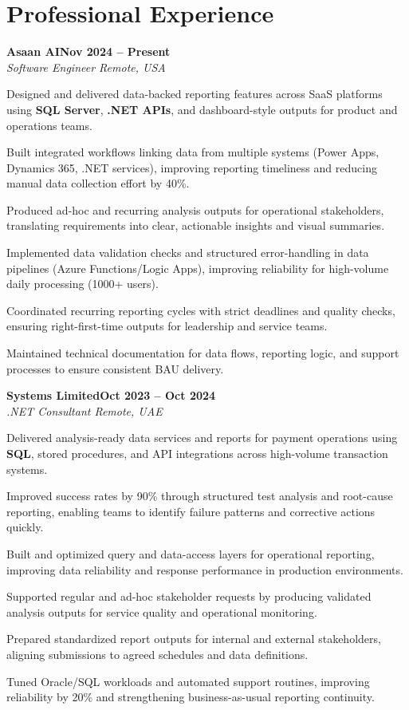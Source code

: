 \documentclass[letterpaper,10pt]{article}
\newcommand{\headingBf}[2]{
  \hspace{10pt}\textbf{#1}\hfill\textbf{#2}\\
}
\newcommand{\headingIt}[2]{
  \hspace{10pt}\textit{#1}\hfill\textit{#2}\\
}
\newenvironment{resume_list}{
  \vspace{-7pt}
  \begin{itemize}[itemsep=-2px, parsep=1pt, leftmargin=30pt]
}{
  \end{itemize}
}
\begin{document}
\section{Professional Experience}

\headingBf{Asaan AI}{Nov 2024 -- Present}
\headingIt{Software Engineer \hfill Remote, USA}{}
\begin{resume_list}
    \item Designed and delivered data-backed reporting features across SaaS platforms using \textbf{SQL Server}, \textbf{.NET APIs}, and dashboard-style outputs for product and operations teams.
    \item Built integrated workflows linking data from multiple systems (Power Apps, Dynamics 365, .NET services), improving reporting timeliness and reducing manual data collection effort by 40\%.
    \item Produced ad-hoc and recurring analysis outputs for operational stakeholders, translating requirements into clear, actionable insights and visual summaries.
    \item Implemented data validation checks and structured error-handling in data pipelines (Azure Functions/Logic Apps), improving reliability for high-volume daily processing (1000+ users).
    \item Coordinated recurring reporting cycles with strict deadlines and quality checks, ensuring right-first-time outputs for leadership and service teams.
    \item Maintained technical documentation for data flows, reporting logic, and support processes to ensure consistent BAU delivery.
\end{resume_list}

\headingBf{Systems Limited}{Oct 2023 -- Oct 2024}
\headingIt{.NET Consultant \hfill Remote, UAE}{}
\begin{resume_list}
    \item Delivered analysis-ready data services and reports for payment operations using \textbf{SQL}, stored procedures, and API integrations across high-volume transaction systems.
    \item Improved success rates by 90\% through structured test analysis and root-cause reporting, enabling teams to identify failure patterns and corrective actions quickly.
    \item Built and optimized query and data-access layers for operational reporting, improving data reliability and response performance in production environments.
    \item Supported regular and ad-hoc stakeholder requests by producing validated analysis outputs for service quality and operational monitoring.
    \item Prepared standardized report outputs for internal and external stakeholders, aligning submissions to agreed schedules and data definitions.
    \item Tuned Oracle/SQL workloads and automated support routines, improving reliability by 20\% and strengthening business-as-usual reporting continuity.
\end{resume_list}
\end{document}
